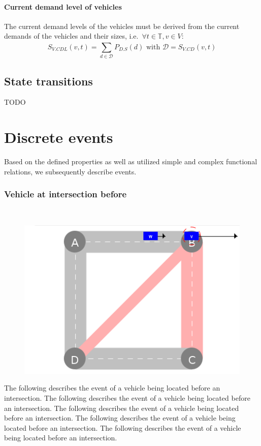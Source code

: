 \documentclass[graybox]{svmult}
\begin{document}
\paragraph{Current demand level of vehicles}
The current demand levels of the vehicles must be derived from the current demands of the vehicles and their sizes, i.e.\ $\forall t \in \mathbb{T}, v \in V:$
\[
S_{V.CDL}(v,t)=\sum_{d \in \mathcal{D}}^{}P_{D.S}(d) \textrm{ with } \mathcal{D}=S_{V.CD}(v,t)
\]

\subsection{State transitions}
\label{sec:transitions}
TODO

\section{Discrete events}
\label{sec:events}
Based on the defined properties as well as utilized simple and complex functional relations, we subsequently describe events.

\subsubsection{Vehicle at intersection before}
\
\begin{figure}
	\centering
		\includegraphics[scale=0.35]{../../events/vehicle-at-intersection-before.png}
\end{figure}
The following describes the event of a vehicle being located before an intersection. 
The following describes the event of a vehicle being located before an intersection. 
The following describes the event of a vehicle being located before an intersection. 
The following describes the event of a vehicle being located before an intersection. 
The following describes the event of a vehicle being located before an intersection. 
\end{document}
